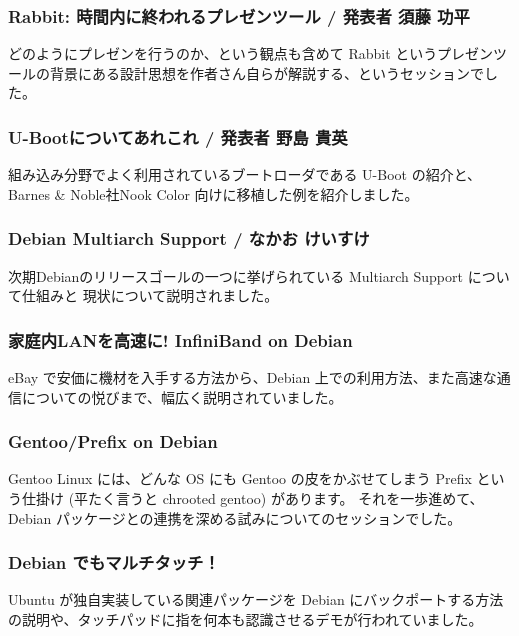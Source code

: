\documentclass[mingoth,a4paper]{jsarticle}
\begin{document}
\subsubsection{Rabbit: 時間内に終われるプレゼンツール / 発表者 須藤 功平}

どのようにプレゼンを行うのか、という観点も含めて Rabbit というプレゼンツールの背景にある設計思想を作者さん自らが解説する、というセッションでした。

\subsubsection{U-Bootについてあれこれ / 発表者 野島 貴英}

組み込み分野でよく利用されているブートローダである U-Boot の紹介と、Barnes \& Noble社Nook Color 向けに移植した例を紹介しました。

\subsubsection{Debian Multiarch Support / なかお けいすけ}

次期Debianのリリースゴールの一つに挙げられている Multiarch Support について仕組みと
現状について説明されました。

\subsubsection{家庭内LANを高速に! InfiniBand on Debian}

eBay で安価に機材を入手する方法から、Debian 上での利用方法、また高速な通信についての悦びまで、幅広く説明されていました。

\subsubsection{Gentoo/Prefix on Debian}

Gentoo Linux には、どんな OS にも Gentoo の皮をかぶせてしまう Prefix という仕掛け (平たく言うと chrooted gentoo) があります。
それを一歩進めて、Debian パッケージとの連携を深める試みについてのセッションでした。

\subsubsection{Debian でもマルチタッチ！}

Ubuntu が独自実装している関連パッケージを Debian にバックポートする方法の説明や、タッチパッドに指を何本も認識させるデモが行われていました。
\end{document}
